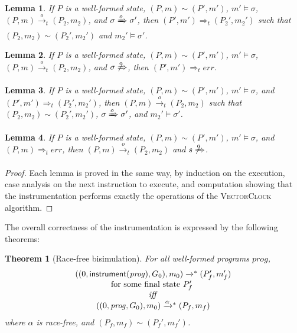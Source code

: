 \documentclass[preprint, 9pt]{sigplanconf}
\newcommand{\VCalg}{\textsc{VectorClock}\xspace}
\newcommand{\instrp}[1]{\ensuremath{\mathsf{instrument}(#1)}}
\newcommand{\cfg}[2]{\ensuremath{(#1, #2)}}
\newcommand{\anarrow}[2]{\ensuremath{\xrightarrow{#2}_{#1}}}
\newcommand{\exec}[5]{\ensuremath{\cfg{#1}{#2} \anarrow{#3}{#4} #5}}
\newcommand{\execstar}[4]{\ensuremath{\cfg{#1}{#2} \tto{#3} #4}}
\newcommand{\iexec}[4]{\ensuremath{\cfg{#1}{#2} \Rightarrow_{#3} #4}}
\newcommand{\tto}[1]{\mathrel{
  \vphantom{\xrightarrow{#1}}
  \smash{\xrightarrow{#1}}
  \vphantom{\to}^{*}}
}
\newtheorem{lemma}{Lemma}
\newtheorem{theorem}{Theorem}
\begin{document}
\begin{lemma}If $P$ is a well-formed state, $(P, m) \sim (P', m')$, $m' \models \sigma$, $\exec{P}{m}{t}{o}{(P_2, m_2)}$, and $\sigma \xRightarrow{o} \sigma'$, then $\iexec{P'}{m'}{t}{(P_2', m_2')}$ such that $(P_2, m_2) \sim (P_2', m_2')$ and $m_2' \models \sigma'$.\end{lemma}
 \begin{lemma}If $P$ is a well-formed state, $(P, m) \sim (P', m')$, $m' \models \sigma$, $\exec{P}{m}{t}{o}{(P_2, m_2)}$, and $\sigma \not\xRightarrow{o}$, then $\iexec{P'}{m'}{t}{\mathit{err}}$.\end{lemma}
 \begin{lemma}If $P$ is a well-formed state, $(P, m) \sim (P', m')$, $m' \models \sigma$, and $\iexec{P'}{m'}{t}{(P_2', m_2')}$, then $\exec{P}{m}{t}{o}{(P_2, m_2)}$ such that $(P_2, m_2) \sim (P_2', m_2')$, $\sigma \xRightarrow{o} \sigma'$, and $m_2' \models \sigma'$.\end{lemma}
 \begin{lemma}If $P$ is a well-formed state, $(P, m) \sim (P', m')$, $m' \models \sigma$, and $\iexec{P}{m}{t}{\mathit{err}}$, then $\exec{P}{m}{t}{o}{(P_2, m_2)}$ and $s \not\xRightarrow{o}$.\end{lemma}
\begin{proof}Each lemma is proved in the same way, by induction on the execution, case analysis on the next instruction to execute, and computation showing that the instrumentation performs exactly the operations of the \VCalg algorithm.\end{proof}

The overall correctness of the instrumentation is expressed by the following theorems:

\begin{theorem}[Race-free bisimulation]\label{safe} 
 For all  well-formed programs $\mathit{prog}$, 
\[
\begin{array}{c}
\execstar{(0, \instrp{\mathit{prog}}, G_0)}{m_0}{}{(P_f', m_f')}    
\\
\mbox{for some final state $P_f'$ }
\\
\mathit{iff} \\ 
\execstar{(0, \mathit{prog}, G_0)}{m_0}{\alpha}{(P_f, m_f)}
\end{array}
\]
where $\alpha$ is race-free, and $(P_f, m_f) \sim (P_f', m_f')$.
\end{theorem}
\end{document}
